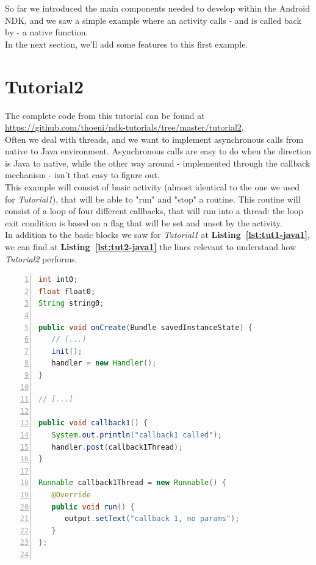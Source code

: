 \documentclass[a4paper,10pt]{article}
\newcommand{\refl}[1]{\textbf{Listing~\ref{#1}}}
\begin{document}
\begin{multicols}{2}
So far we introduced the main components needed to develop within the Android
NDK, and we saw a simple example where an activity calls - and is called back
by - a native function.\\
In the next section, we'll add some features to this first example.


\section{Tutorial2}
\label{sec:tutorial2}
The complete code from this tutorial can be found at
\url{https://github.com/thoeni/ndk-tutorials/tree/master/tutorial2}.\\
Often we deal with threads, and we want to implement asynchronous calls from
native to Java environment. Asynchronous calls are easy to do when the direction
is Java to native, while the other way around - implemented through the callback
mechanism - isn't that easy to figure out.\\
This example will consist of basic activity (almost identical to the one we used
for \textit{Tutorial1}), that will be able to "run" and "stop" a routine. This
routine will consist of a loop of four different callbacks, that will run into a
thread: the loop exit condition is based on a flag that will be set and unset by
the activity.\\
In addition to the basic blocks we saw for \textit{Tutorial1} at
\refl{lst:tut1-java1}, we can find at \refl{lst:tut2-java1} the lines relevant
to understand how \textit{Tutorial2} performs.
\begin{lstlisting}[language=Java,
		   columns=fullflexible,
		   showstringspaces=false,
		   xleftmargin=15pt,
		   frame = l,
		   numbers=left,
		   commentstyle=\color{gray}\upshape,
		   caption=Part of Tutorial2Activity.java source code,
		   label=lst:tut2-java1]
int int0;
float float0;
String string0;

public void onCreate(Bundle savedInstanceState) {
   // [...]
   init();
   handler = new Handler();
}

// [...]

public void callback1() {
   System.out.println("callback1 called");
   handler.post(callback1Thread);
}

Runnable callback1Thread = new Runnable() {
   @Override
   public void run() {
      output.setText("callback 1, no params");
   }
};


\end{lstlisting}
\end{multicols}
\end{document}
